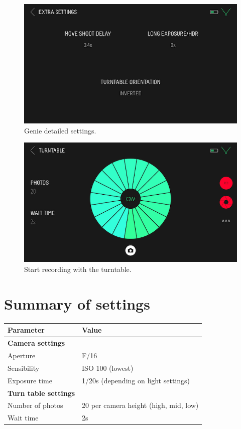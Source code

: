 \documentclass[
]{book}
\begin{document}
\begin{figure}

{\centering \includegraphics[width=0.5\linewidth]{Figures/genie_settings} 

}

\caption{Genie detailed settings.}\label{fig:genie-settings}
\end{figure}

\begin{figure}

{\centering \includegraphics[width=0.5\linewidth]{Figures/genie_turntable_20_1} 

}

\caption{Start recording with the turntable.}\label{fig:genie-record}
\end{figure}

\hypertarget{summary-of-settings}{%
\section{Summary of settings}\label{summary-of-settings}}

\begin{longtable}[]{@{}ll@{}}
\toprule
\textbf{Parameter} & \textbf{Value} \\
\midrule
\endhead
\textbf{Camera settings} & \\
Aperture & F/16 \\
Sensibility & ISO 100 (lowest) \\
Exposure time & 1/20s (depending on light settings) \\
\textbf{Turn table settings} & \\
Number of photos & 20 per camera height (high, mid, low) \\
Wait time & 2s \\
\bottomrule
\end{longtable}
\end{document}
